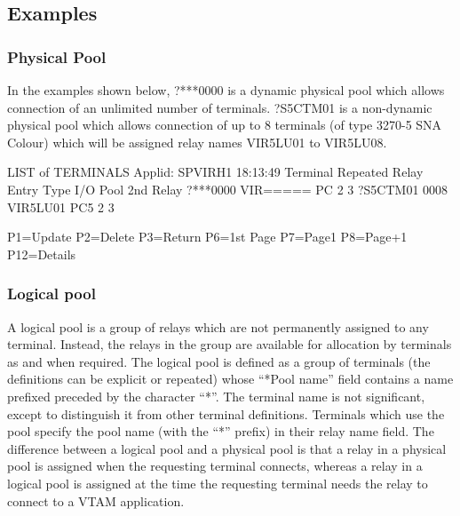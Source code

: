 \documentclass[letterpaper,10pt,english]{sphinxmanual}
\begin{document}
\subsection{Examples}
\label{\detokenize{connectivity_guide:examples}}

\subsubsection{Physical Pool}
\label{\detokenize{connectivity_guide:physical-pool}}
In the examples shown below, ?***0000 is a dynamic physical pool which allows connection of an unlimited number of terminals. ?S5CTM01 is a non-dynamic physical pool which allows connection of up to 8 terminals (of type 3270-5 SNA Colour) which will be assigned relay names VIR5LU01 to VIR5LU08.

\begin{sphinxVerbatim}[commandchars=\\\{\}]
LIST of TERMINALS \PYGZhy{}\PYGZhy{}\PYGZhy{}\PYGZhy{}\PYGZhy{}\PYGZhy{}\PYGZhy{}\PYGZhy{}\PYGZhy{}\PYGZhy{}\PYGZhy{}\PYGZhy{}\PYGZhy{}\PYGZhy{}\PYGZhy{}\PYGZhy{}\PYGZhy{}\PYGZhy{}\PYGZhy{}\PYGZhy{}\PYGZhy{}\PYGZhy{}\PYGZhy{}\PYGZhy{}\PYGZhy{}\PYGZhy{}\PYGZhy{}\PYGZhy{}\PYGZhy{}\PYGZhy{}\PYGZhy{}\PYGZhy{}\PYGZhy{}\PYGZhy{} Applid: SPVIRH1 18:13:49
Terminal Repeated   Relay    Entry   Type I/O Pool 2nd Relay
?***0000            VIR===== PC      2    3
?S5CTM01 0008       VIR5LU01 PC5     2    3


P1=Update           P2=Delete        P3=Return         P6=1st Page
P7=Page\PYGZhy{}1           P8=Page+1        P12=Details
\end{sphinxVerbatim}



\subsubsection{Logical pool}
\label{\detokenize{connectivity_guide:bookmark246}}\label{\detokenize{connectivity_guide:logical-pool}}
A logical pool is a group of relays which are not permanently assigned to any terminal. Instead, the relays in the group are available for allocation by terminals as and when required. The logical pool is defined as a group of terminals (the definitions can be explicit or repeated) whose “*Pool name” field contains a name prefixed preceded by the character “*”. The terminal name is not significant, except to distinguish it from other terminal definitions. Terminals which use the pool specify the pool name (with the “*” prefix) in their relay name field. The difference between a logical pool and a physical pool is that a relay in a physical pool is assigned when the requesting terminal connects, whereas a relay in a logical pool is assigned at the time the requesting terminal needs the relay to connect to a VTAM application.
\end{document}
